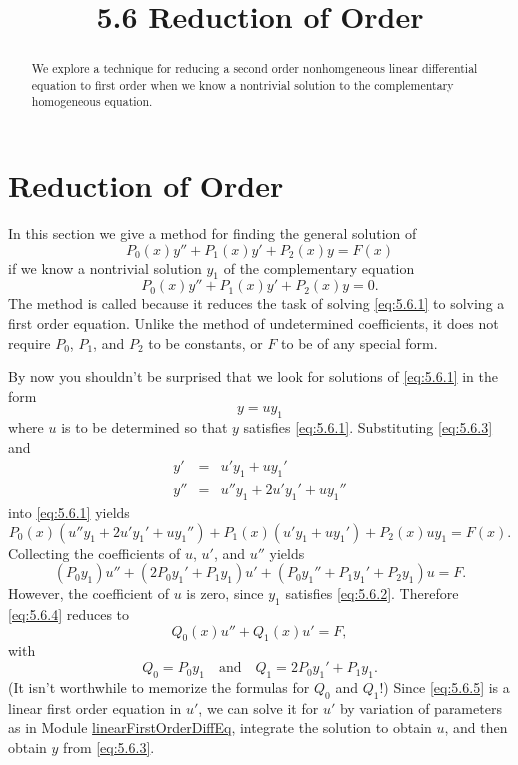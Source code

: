 \documentclass{ximera}
\title{5.6 Reduction of Order}
\begin{document}
 
\begin{abstract}
 We explore a technique for reducing a second order nonhomgeneous linear differential equation to first order when we know a nontrivial solution to the complementary homogeneous equation.
\end{abstract}
 
\maketitle
 
\section*{Reduction of Order}
 
In this section we give a method for finding the general
solution of
\begin{equation} \label{eq:5.6.1}
P_0(x)y''+P_1(x)y'+P_2(x)y=F(x)
\end{equation}
if we know  a nontrivial solution $y_1$ of the complementary equation
\begin{equation} \label{eq:5.6.2}
P_0(x)y''+P_1(x)y'+P_2(x)y=0.
\end{equation}
The method is called  because it reduces
the task of solving \eqref{eq:5.6.1} to solving a first order equation.
Unlike the method of undetermined coefficients, it does not require
$P_0$, $P_1$, and $P_2$ to be constants, or $F$ to be of any special
form.
 
By now you shouldn't be surprised that we look for
solutions of \eqref{eq:5.6.1} in the form
\begin{equation} \label{eq:5.6.3}
y=uy_1
\end{equation}
where $u$ is to be determined so that $y$ satisfies \eqref{eq:5.6.1}.
Substituting \eqref{eq:5.6.3} and
$$\begin{array}{rcl}
y'&=& u'y_1+uy_1' \\
y''&=& u''y_1+2u'y_1'+uy_1''
\end{array}$$
into \eqref{eq:5.6.1} yields
$$
P_0(x)(u''y_1+2u'y_1'+uy_1'')+P_1(x)(u'y_1+uy_1')+P_2(x)uy_1=F(x).
$$
Collecting the coefficients of $u$, $u'$, and $u''$ yields
\begin{equation} \label{eq:5.6.4}
(P_0y_1)u''+(2P_0y_1'+P_1y_1)u'+(P_0y_1''+P_1y_1'+P_2y_1)
u=F.
\end{equation}
However, the coefficient of $u$ is zero, since $y_1$ satisfies
\eqref{eq:5.6.2}. Therefore \eqref{eq:5.6.4} reduces to
\begin{equation} \label{eq:5.6.5}
Q_0(x)u''+Q_1(x)u'=F,
\end{equation}
with
$$
Q_0=P_0y_1 \quad\mbox{and}\quad Q_1=2P_0y_1'+P_1y_1.
$$
(It isn't worthwhile to memorize the formulas for $Q_0$ and $Q_1$!)
Since \eqref{eq:5.6.5} is a linear first order equation in $u'$, we can
solve it for $u'$ by variation of parameters as in
Module \href{https://ximera.osu.edu/ode/main/linearFirstOrderDiffEq/linearFirstOrderDiffEq}{linearFirstOrderDiffEq}, integrate the solution to obtain $u$, and then
obtain $y$ from \eqref{eq:5.6.3}.
 
\end{document}
